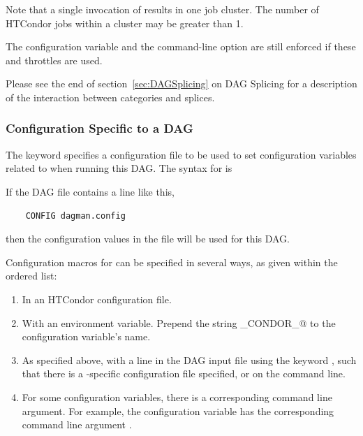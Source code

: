 Note that a single invocation
of  results in one job cluster.
The number of HTCondor jobs within a cluster may be greater than 1. 

The  configuration variable  
and the   command-line option
are still enforced if these  and  throttles are used.

Please see the end of section~\ref{sec:DAGSplicing}
on DAG Splicing for a description of the interaction between
categories and splices.

\subsubsection{\label{sec:DAG-configuration}Configuration Specific to a DAG}

The  keyword specifies a configuration file to be used
to set configuration variables related to 
when running this DAG.
The syntax for  is

 

If the DAG file contains a line like this,
\begin{verbatim}
    CONFIG dagman.config
\end{verbatim}
then the configuration values in the file  will be used
for this DAG.

Configuration macros for  can be specified in several
ways, as given within the ordered list:
\begin{enumerate}
\item
In an HTCondor configuration file.
\item
With an environment variable.
Prepend the string \verb@_CONDOR_@ to the configuration variable's name.
\item
As specified above, with a line in the DAG input file
using the keyword , such that there is a -specific
configuration file specified,
or on the  command line.
\item
For some configuration variables,
there is a corresponding  command line argument.
For example, the configuration variable 
has the corresponding command line argument .
\end{enumerate}

